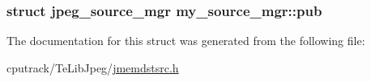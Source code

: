 \subsubsection[{\texorpdfstring{pub}{pub}}]{\setlength{\rightskip}{0pt plus 5cm}struct jpeg\+\_\+source\+\_\+mgr my\+\_\+source\+\_\+mgr\+::pub}\hypertarget{structmy__source__mgr_a8572f33f87bec948592001edea12680f}{}\label{structmy__source__mgr_a8572f33f87bec948592001edea12680f}


The documentation for this struct was generated from the following file\+:\begin{DoxyCompactItemize}
\item 
cputrack/\+Te\+Lib\+Jpeg/\hyperlink{jmemdstsrc_8h}{jmemdstsrc.\+h}\end{DoxyCompactItemize}
